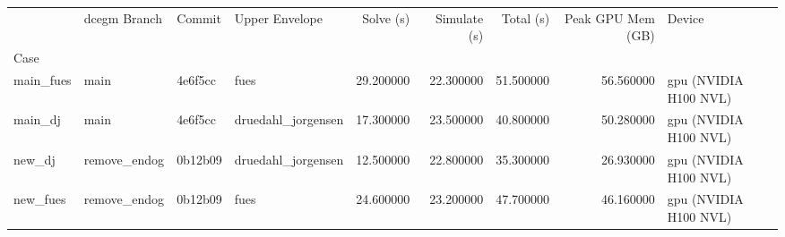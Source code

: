 \begin{tabular}{llllrrrrl}
\toprule
 & dcegm Branch & Commit & Upper Envelope & Solve (s) & Simulate (s) & Total (s) & Peak GPU Mem (GB) & Device \\
Case &  &  &  &  &  &  &  &  \\
\midrule
main_fues & main & 4e6f5cc & fues & 29.200000 & 22.300000 & 51.500000 & 56.560000 & gpu (NVIDIA H100 NVL) \\
main_dj & main & 4e6f5cc & druedahl_jorgensen & 17.300000 & 23.500000 & 40.800000 & 50.280000 & gpu (NVIDIA H100 NVL) \\
new_dj & remove_endog & 0b12b09 & druedahl_jorgensen & 12.500000 & 22.800000 & 35.300000 & 26.930000 & gpu (NVIDIA H100 NVL) \\
new_fues & remove_endog & 0b12b09 & fues & 24.600000 & 23.200000 & 47.700000 & 46.160000 & gpu (NVIDIA H100 NVL) \\
\bottomrule
\end{tabular}

